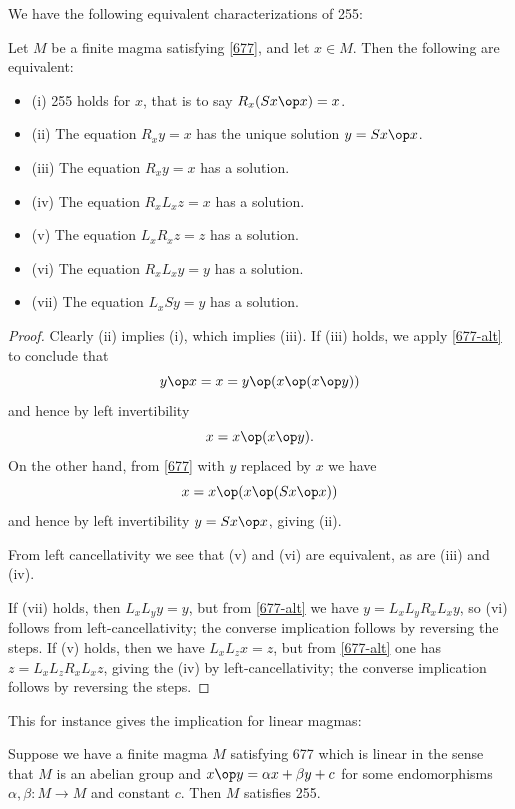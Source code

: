 We have the following equivalent characterizations of 255:

\begin{lemma}\label{255-equiv} Let $M$ be a finite magma satisfying \eqref{677}, and let $x \in M$.  Then the following are equivalent:
\begin{itemize}
  \item (i)  255 holds for $x$, that is to say $R_x (Sx \op x) = x$.
  \item (ii) The equation $R_x y = x$ has the unique solution $y = Sx \op x$.
  \item (iii) The equation $R_x y = x$ has a solution.
  \item (iv) The equation $R_x L_x z = x$ has a solution.
  \item (v) The equation $L_x R_x z = z$ has a solution.
  \item (vi) The equation $R_x L_x y = y$ has a solution.
  \item (vii) The equation $L_x S y = y$ has a solution.
\end{itemize}
\end{lemma}

\begin{proof} Clearly (ii) implies (i), which implies (iii).  If (iii) holds,
  we apply \eqref{677-alt} to conclude that
  $$ y \op x = x = y \op (x \op (x \op y))$$
  and hence by left invertibility
  $$ x = x \op (x \op y).$$
  On the other hand, from \eqref{677} with $y$ replaced by $x$ we have
  $$ x = x \op (x \op (Sx \op x))$$
 and hence by left invertibility $y = Sx \op x$, giving (ii).

From left cancellativity we see that (v) and (vi) are equivalent, as are (iii) and (iv).

If (vii) holds, then $L_x L_y y = y$, but from \eqref{677-alt} we have $y = L_x L_y R_x L_x y$, so (vi) follows from left-cancellativity; the converse implication follows by reversing the steps.  If (v) holds, then we have $L_x L_z x = z$, but from \eqref{677-alt} one has $z = L_x L_z R_x L_x z$, giving the (iv) by left-cancellativity; the converse implication follows by reversing the steps.
\end{proof}


This for instance gives the implication for linear magmas:

\begin{lemma}\label{linear-obstruction}  Suppose we have a finite magma $M$ satisfying 677 which is linear in the sense that $M$ is an abelian group and $x \op y = \alpha x + \beta y + c$ for some endomorphisms $\alpha,\beta: M \to M$ and constant $c$.  Then $M$ satisfies 255.
\end{lemma}

